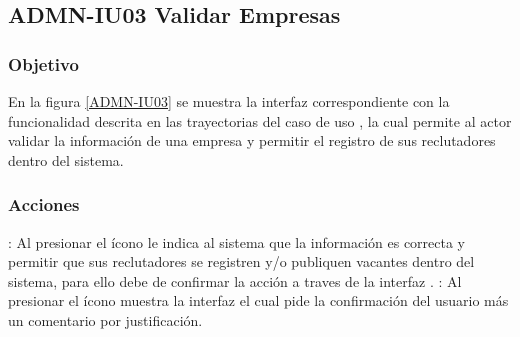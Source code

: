 \clearpage
\subsection{ADMN-IU03 Validar Empresas}

\subsubsection{Objetivo}
En la figura \ref{ADMN-IU03} se muestra la interfaz correspondiente con la funcionalidad descrita en las trayectorias del caso de uso , 
la cual permite al actor validar la información de una empresa y permitir el registro de sus reclutadores dentro del sistema.

\subsubsection{Acciones}
\Titem \IUAprobarE{} : Al presionar el ícono le indica al sistema que la información es correcta y permitir que sus reclutadores se registren y/o publiquen vacantes dentro del sistema, para ello debe de confirmar la acción a traves de la interfaz .
\Titem \IUDescartar{} : Al presionar el ícono muestra la interfaz  el cual pide la confirmación del usuario más un comentario por justificación.

  

\clearpage
